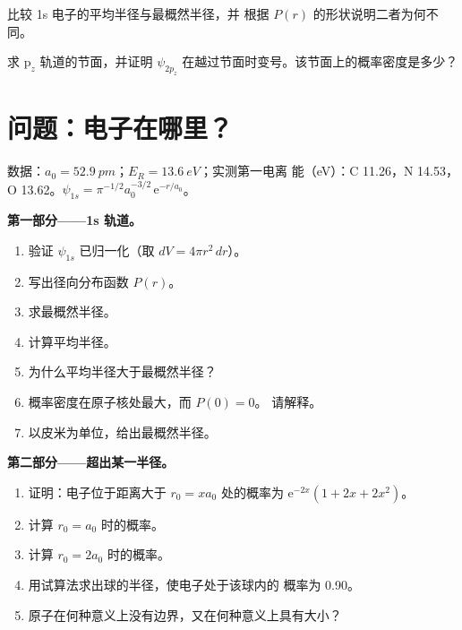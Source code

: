 \begin{exercise}[$\star\star\star$]\label{exo:b2:atomic-orbitals:11}
比较 1s 电子的平均半径与最概然半径，并
根据 $P(r)$ 的形状说明二者为何不同。
\end{exercise}

\begin{exercise}[$\star\star\star$]\label{exo:b2:atomic-orbitals:12}
求 $\mathrm p_z$ 轨道的节面，并证明 $\psi_{2p_z}$
在越过节面时变号。该节面上的概率密度是多少？
\end{exercise}

\section{问题：电子在哪里？}

\begin{problem}
\label{pb:b2:atomic-orbitals:1}
数据：$a_0 = \qty{52.9}{pm}$；$E_R = \qty{13.6}{eV}$；实测第一电离
能（\unit{eV}）：C 11.26，N 14.53，O 13.62。$\psi_{1s} = \pi^{-1/2}a_0^{-3/2}\,
\mathrm e^{-r/a_0}$。

\medskip
\noindent\textbf{第一部分——1s 轨道。}
\begin{enumerate}
  \item 验证 $\psi_{1s}$ 已归一化（取 $dV = 4\pi r^2\,dr$）。
  \item 写出径向分布函数 $P(r)$。
  \item 求最概然半径。
  \item 计算平均半径。
  \item 为什么平均半径大于最概然半径？
  \item 概率密度在原子核处最大，而 $P(0) = 0$。
        请解释。
  \item 以皮米为单位，给出最概然半径。
\end{enumerate}

\medskip
\noindent\textbf{第二部分——超出某一半径。}
\begin{enumerate}[resume]
  \item 证明：电子位于距离大于 $r_0 =
        xa_0$ 处的概率为 $\mathrm e^{-2x}(1 + 2x + 2x^2)$。
  \item 计算 $r_0 = a_0$ 时的概率。
  \item 计算 $r_0 = 2a_0$ 时的概率。
  \item 用试算法求出球的半径，使电子处于该球内的
        概率为 0.90。
  \item 原子在何种意义上没有边界，又在何种意义上具有大小？
\end{enumerate}


\end{problem}
